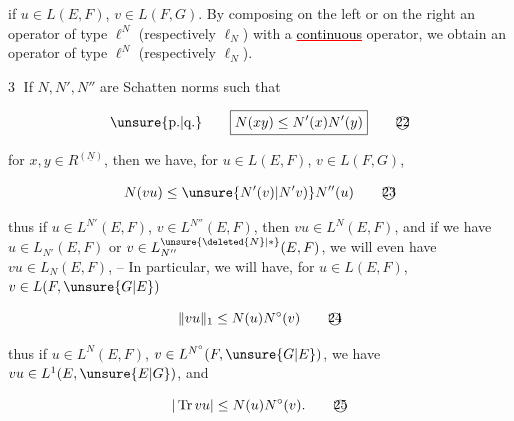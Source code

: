 if $u\in L(E,F)$, $v\in L(F,G)$.  By composing on the left or on the right an operator  of type $\ell^N$ (respectively $\ell_N$) with a  \textcolor{red}{\uline{\textcolor{black}{continuous}}} operator, we obtain an operator of type $\ell^N$ (respectively $\ell_N$).

\textcircled{3}  If $N,N',N''$ are  Schatten norms such that

\[
\text{\unsure{p.|q.}}\qquad\boxed{N(xy)\leq N'(x)N'(y)}\tag*{\textcircled{22}}
\]

for $x,y\in R^{(\underline N)}$, then we have, for $u\in L(E,F)$, $v\in L(F,G)$,

\[
N(vu)\leq \unsure{N'(v)|N'v)}N''(u)\tag*{\textcircled{23}}
\]

thus if $u\in L^{N'}(E,F)$, $v\in L^{N''}(E,F)$, then $vu\in L^N(E,F)$, and if we have  $u\in L_{N'}(E,F)$ or $v\in L_{N''}^{\unsure{\deleted{N}|*}}(E,F)$, we will even have $vu\in L_N(E,F)$, -- In particular, we will have, for $u\in L(E,F)$, $v\in L(F,\unsure{G|E})$

\[
\lVert vu\rVert_1\leq N(u)N^\circ(v)\tag*{\textcircled{24}}
\]

thus if $u\in L^N(E,F)$, $v\in L^{N^\circ}(F,\unsure{G|E})$, we have $vu\in L^1(E,\unsure{E|G})$, and

\[
|\operatorname{Tr}vu|\leq N(u)N^\circ(v).\tag*{\textcircled{25}}
\]

